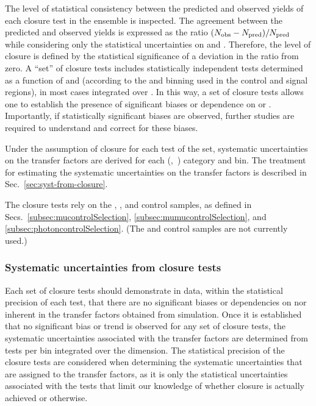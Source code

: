 The level of statistical consistency between the predicted and
observed yields of each closure test in the ensemble is inspected. The
agreement between the predicted and observed yields is
expressed as the ratio $(\nobs - \npre)/\npre$ while considering only
the statistical uncertainties on \npre and \nobs. Therefore, the level
of closure is defined by the statistical significance of a deviation
in the ratio from zero. A ``set'' of closure tests includes
statistically independent tests determined as a function of \scalht
and \njet (according to the \scalht and \njet binning used in the control and signal
regions), in most cases integrated over \nb. In this way, a set of closure 
tests allows one to establish
the presence of significant biases or dependence on
\scalht or \njet. Importantly, if statistically significant biases are
observed, further studies are required to understand and correct for
these biases. 

Under the assumption of closure for each test of the set,
systematic uncertainties on the transfer factors are derived for each
(\njet,~\nb) category and \scalht bin. The treatment for estimating
the systematic uncertainties on the transfer factors is described in
Sec.~\ref{sec:syst-from-closure}.

The closure tests rely on the \mj, \mmj, and \gj control samples,
as defined in Secs.~\ref{subsec:mucontrolSelection},
\ref{subsec:mumucontrolSelection}, and
\ref{subsec:photoncontrolSelection}. (The \ej and \eej control samples
are not currently used.)

\subsubsection{Systematic uncertainties from closure tests\label{sec:syst-from-closure}}

Each set of closure tests should demonstrate in data, within the
statistical precision of each test, that there are no significant
biases or dependencies on \njet nor \scalht inherent in the transfer
factors obtained from simulation. 
Once it is established that no significant bias or trend is observed
for any set of closure tests, the systematic uncertainties associated
with the transfer factors are determined from tests per \scalht bin
integrated over the \njet dimension. The statistical precision of the 
closure tests are considered
when determining the systematic uncertainties that are assigned to the
transfer factors, as it is only the statistical uncertainties
associated with the tests that limit our knowledge of whether closure
is actually achieved or otherwise. 

